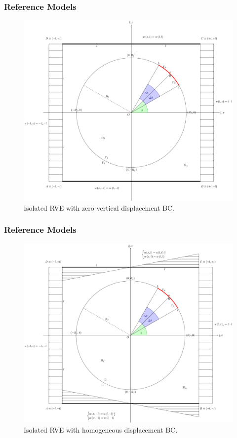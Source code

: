 \documentclass[first,firstsupp,lastsupp,handout,last,hyperref,table]{ETHclass}
\begin{document}
\begin{frame}
\frametitle{Reference Models}
\vspace{-0.25cm}
\centering
\begin{figure}
\centering
\includegraphics[height=0.7\textheight]{LEFM2DsRVEsFsDdepverdispBCULappAxialDispLR.pdf}
\caption{\scriptsize Isolated RVE with zero vertical displacement BC.}
\label{fig:singleRVE-rigid}
\end{figure}
\end{frame}

\begin{frame}
\frametitle{Reference Models}
\vspace{-0.25cm}
\centering
\begin{figure}
\centering
\includegraphics[height=0.7\textheight]{LEFM2DsRVEsFsDhomoBCULappAxialDispLR.pdf}
\caption{\scriptsize Isolated RVE with homogeneous displacement BC.}
\label{fig:singleRVE-homo}
\end{figure}
\end{frame}
\end{document}
